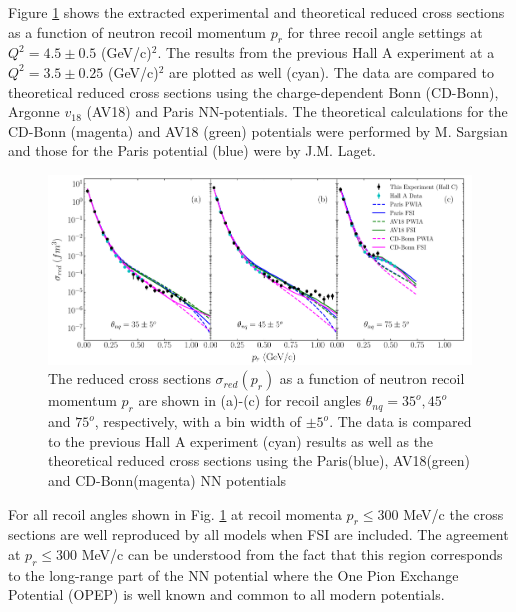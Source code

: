 Figure \ref{fig:fig1} shows the extracted experimental and theoretical reduced cross sections as a function of neutron recoil momentum $p_{r}$ for three recoil angle settings at $Q^{2}=4.5\pm0.5$
(GeV/c)$^{2}$. The results from the previous Hall A experiment\cite{PhysRevLett.107.262501} at a $Q^{2}=3.5\pm0.25$ (GeV/c)$^{2}$ are plotted as well (cyan). The data are compared to theoretical reduced
cross sections using the charge-dependent Bonn (CD-Bonn)\cite{PhysRevC.63.024001}, Argonne $v_{18}$ (AV18)\cite{PhysRevC.51.38} and Paris\cite{PhysRevC.21.861} NN-potentials. The theoretical calculations
for the CD-Bonn (magenta) and AV18 (green) potentials were performed by M. Sargsian\cite{PhysRevC.82.014612} and those for the Paris potential  (blue) were  by J.M. Laget\cite{LAGET2005}.

\begin{center}
\begin{figure}[htp!]
\includegraphics[scale=0.5]{./prl_plots/PRL_plot1.pdf}
\caption{The reduced cross sections $\sigma_{red}(p_{r})$ as a function of neutron recoil momentum $p_{r}$ are shown in (a)-(c) for recoil angles $\theta_{nq}=35^{o}, 45^{o}$ and $75^{o}$, respectively,
with a bin width of $\pm 5^{o}$. The data is compared to the previous Hall A experiment (cyan) results\cite{PhysRevLett.107.262501} as well as the theoretical reduced cross sections using the Paris(blue),
AV18(green) and CD-Bonn(magenta) NN potentials}
\label{fig:fig1}
\end{figure}
\end{center}

For all recoil angles shown in Fig. \hyperref[fig:fig1]{1} at recoil momenta $p_{r}\leq$300 MeV/c the cross sections are well reproduced  by  all models when FSI are included. The agreement at $p_{r}\leq300$ MeV/c can be understood from the fact that this region corresponds to the long-range part of the NN potential where the One Pion Exchange Potential (OPEP) is well known and common to all modern potentials.

